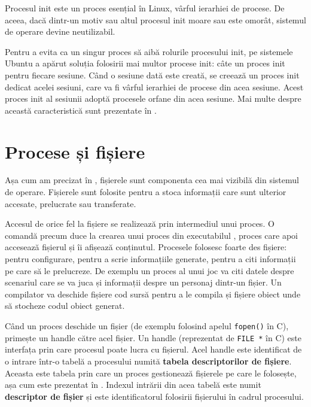 Procesul init este un proces esențial în Linux, vârful ierarhiei de procese.
De aceea, dacă dintr-un motiv sau altul procesul init moare sau este omorât, sistemul de operare devine neutilizabil.

Pentru a evita ca un singur proces să aibă rolurile procesului init, pe sistemele Ubuntu a apărut soluția folosirii mai multor procese init: câte un proces init pentru fiecare sesiune.
Când o sesiune dată este creată, se creează un proces init dedicat acelei sesiuni, care va fi vârful ierarhiei de procese din acea sesiune.
Acest proces init al sesiunii adoptă procesele orfane din acea sesiune.
Mai multe despre această caracteristică sunt prezentate în .

\section{Procese și fișiere}
\label{sec:process:files}

Așa cum am precizat în , fișierele sunt componenta cea mai vizibilă din sistemul de operare.
Fișierele sunt folosite pentru a stoca informații care sunt ulterior accesate, prelucrate sau transferate.

Accesul de orice fel la fișiere se realizează prin intermediul unui proces.
O comandă precum  duce la crearea unui proces din executabilul , proces care apoi accesează fișierul  și îi afișează conținutul.
Procesele folosesc foarte des fișiere: pentru configurare, pentru a scrie informațiile generate, pentru a citi informații pe care să le prelucreze.
De exemplu un proces al unui joc va citi datele despre scenariul care se va juca și informații despre un personaj dintr-un fișier.
Un compilator va deschide fișiere cod sursă pentru a le compila și fișiere obiect unde să stocheze codul obiect generat.

Când un proces deschide un fișier (de exemplu folosind apelul \texttt{fopen()} în C), primește un handle către acel fișier.
Un handle (reprezentat de \texttt{FILE *} în C) este interfața prin care procesul poate lucra cu fișierul.
Acel handle este identificat de o intrare într-o tabelă a procesului numită \textbf{tabela descriptorilor de fișiere}.
Aceasta este tabela prin care un proces gestionează fișierele pe care le folosește, așa cum este prezentat în .
Indexul intrării din acea tabelă este numit \textbf{descriptor de fișier} și este identificatorul folosirii fișierului în cadrul procesului.

